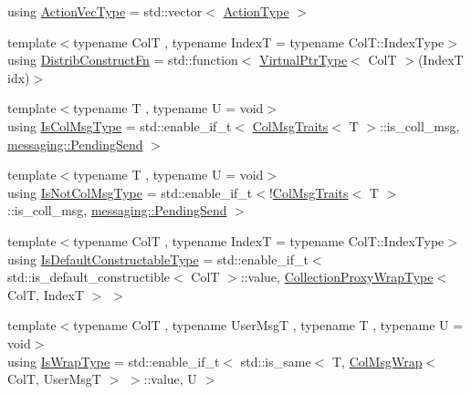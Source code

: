 \begin{DoxyCompactItemize}
\item 
using \hyperlink{structvt_1_1vrt_1_1collection_1_1_collection_manager_a51650235f0e53ae08381942eba822679}{Action\+Vec\+Type} = std\+::vector$<$ \hyperlink{namespacevt_ae0a5a7b18cc99d7b732cb4d44f46b0f3}{Action\+Type} $>$
\item 
{\footnotesize template$<$typename ColT , typename IndexT  = typename Col\+T\+::\+Index\+Type$>$ }\\using \hyperlink{structvt_1_1vrt_1_1collection_1_1_collection_manager_a7503830bc133013d542856fa39834dcc}{Distrib\+Construct\+Fn} = std\+::function$<$ \hyperlink{structvt_1_1vrt_1_1collection_1_1_collection_manager_a1da9015e52d6ecca955f57b59aab0b82}{Virtual\+Ptr\+Type}$<$ ColT $>$(IndexT idx)$>$
\item 
{\footnotesize template$<$typename T , typename U  = void$>$ }\\using \hyperlink{structvt_1_1vrt_1_1collection_1_1_collection_manager_a21c21612c806016788057aeab142af20}{Is\+Col\+Msg\+Type} = std\+::enable\+\_\+if\+\_\+t$<$ \hyperlink{structvt_1_1vrt_1_1collection_1_1_col_msg_traits}{Col\+Msg\+Traits}$<$ T $>$\+::is\+\_\+coll\+\_\+msg, \hyperlink{structvt_1_1messaging_1_1_pending_send}{messaging\+::\+Pending\+Send} $>$
\item 
{\footnotesize template$<$typename T , typename U  = void$>$ }\\using \hyperlink{structvt_1_1vrt_1_1collection_1_1_collection_manager_ae376deeefd4f89a0b1c93849977715d9}{Is\+Not\+Col\+Msg\+Type} = std\+::enable\+\_\+if\+\_\+t$<$!\hyperlink{structvt_1_1vrt_1_1collection_1_1_col_msg_traits}{Col\+Msg\+Traits}$<$ T $>$\+::is\+\_\+coll\+\_\+msg, \hyperlink{structvt_1_1messaging_1_1_pending_send}{messaging\+::\+Pending\+Send} $>$
\item 
{\footnotesize template$<$typename ColT , typename IndexT  = typename Col\+T\+::\+Index\+Type$>$ }\\using \hyperlink{structvt_1_1vrt_1_1collection_1_1_collection_manager_af8091fcb8218dad155ea028c9b5d283f}{Is\+Default\+Constructable\+Type} = std\+::enable\+\_\+if\+\_\+t$<$ std\+::is\+\_\+default\+\_\+constructible$<$ ColT $>$\+::value, \hyperlink{structvt_1_1vrt_1_1collection_1_1_collection_manager_a56458ed7f9bb22b631b9b3a745f42f94}{Collection\+Proxy\+Wrap\+Type}$<$ ColT, IndexT $>$ $>$
\item 
{\footnotesize template$<$typename ColT , typename User\+MsgT , typename T , typename U  = void$>$ }\\using \hyperlink{structvt_1_1vrt_1_1collection_1_1_collection_manager_a1f91c97ed52237c3a3576dfbbe87c8f8}{Is\+Wrap\+Type} = std\+::enable\+\_\+if\+\_\+t$<$ std\+::is\+\_\+same$<$ T, \hyperlink{structvt_1_1vrt_1_1collection_1_1_col_msg_wrap}{Col\+Msg\+Wrap}$<$ ColT, User\+MsgT $>$ $>$\+::value, U $>$

\end{DoxyCompactItemize}
